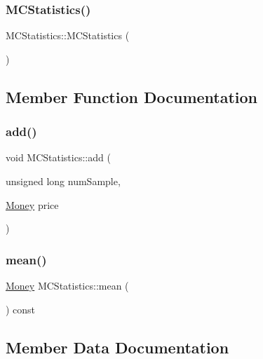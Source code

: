 \subsubsection{\texorpdfstring{M\+C\+Statistics()}{MCStatistics()}}
{\footnotesize\ttfamily M\+C\+Statistics\+::\+M\+C\+Statistics (\begin{DoxyParamCaption}{ }\end{DoxyParamCaption})\hspace{0.3cm}{\ttfamily [inline]}}



\subsection{Member Function Documentation}
\hypertarget{class_m_c_statistics_a6557ced886141997d13d86777b1970c5}{}\label{class_m_c_statistics_a6557ced886141997d13d86777b1970c5} 
\subsubsection{\texorpdfstring{add()}{add()}}
{\footnotesize\ttfamily void M\+C\+Statistics\+::add (\begin{DoxyParamCaption}\item[{unsigned long}]{num\+Sample,  }\item[{\hyperlink{_name_def_8h_a5a9d48c16a694e9a2d9f1eca730dc8c5}{Money}}]{price }\end{DoxyParamCaption})}

\hypertarget{class_m_c_statistics_af1aab02cf590dee3fdc6d7b6cf9443fa}{}\label{class_m_c_statistics_af1aab02cf590dee3fdc6d7b6cf9443fa} 
\subsubsection{\texorpdfstring{mean()}{mean()}}
{\footnotesize\ttfamily \hyperlink{_name_def_8h_a5a9d48c16a694e9a2d9f1eca730dc8c5}{Money} M\+C\+Statistics\+::mean (\begin{DoxyParamCaption}{ }\end{DoxyParamCaption}) const}



\subsection{Member Data Documentation}
\hypertarget{class_m_c_statistics_a60f5e1f87ba55ca837a3067ed726ff9a}{}\label{class_m_c_statistics_a60f5e1f87ba55ca837a3067ed726ff9a} 
